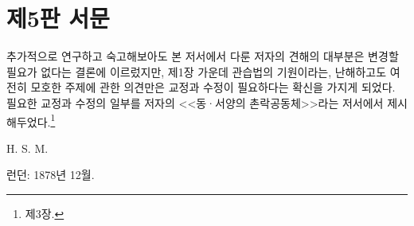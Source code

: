 \chapter*{제5판 서문}

추가적으로 연구하고 숙고해보아도
본 저서에서 다룬 저자의 견해의 대부분은
변경할 필요가 없다는 결론에 이르렀지만,
제1장 가운데
관습법의 기원이라는, 난해하고도 여전히 모호한 주제에 관한 의견만은
교정과 수정이 필요하다는 확신을 가지게 되었다.
필요한 교정과 수정의 일부를
저자의
<<동^^b7서양의 촌락공동체>>라는
저서에서 제시해두었다.\footnote{%
   제3장. }

\begin{flushright}
H. S. M.
\end{flushright}

\begin{footnotesize}
런던: 1878년 12월.
\end{footnotesize}

